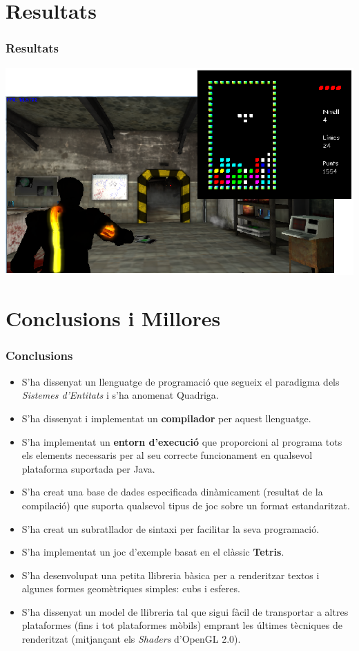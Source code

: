 \documentclass[serif,9pt]{beamer}
\begin{document}
\section{Resultats}

  \begin{frame}\frametitle{Resultats}
    \includegraphics[width=1.00\textwidth]{./img/Screens.png}
  \end{frame}

\section{Conclusions i Millores}

  \begin{frame}\frametitle{Conclusions}
    \begin{itemize}
      \item S'ha dissenyat un llenguatge de programació que segueix el paradigma dels {\em Sistemes d'Entitats} i s'ha anomenat Quadriga.
      \item S'ha dissenyat i implementat un {\bf compilador} per aquest llenguatge.
      \item S'ha implementat un {\bf entorn d'execució} que proporcioni al programa tots els elements necessaris per al seu correcte funcionament en qualsevol plataforma suportada per Java.
      \item S'ha creat una base de dades especificada dinàmicament (resultat de la compilació) que suporta qualsevol tipus de joc sobre un format estandaritzat.
      \item S'ha creat un subratllador de sintaxi per facilitar la seva programació.
      \item S'ha implementat un joc d'exemple basat en el clàssic {\bf Tetris}.
      \item S'ha desenvolupat una petita llibreria bàsica per a renderitzar textos i algunes formes geomètriques simples: cubs i esferes.
      \item S'ha dissenyat un model de llibreria tal que sigui fàcil de transportar a altres plataformes (fins i tot plataformes mòbils) emprant les últimes tècniques de renderitzat (mitjançant els {\em Shaders} d'OpenGL 2.0).
    \end{itemize}
  \end{frame}
  
\end{document}
